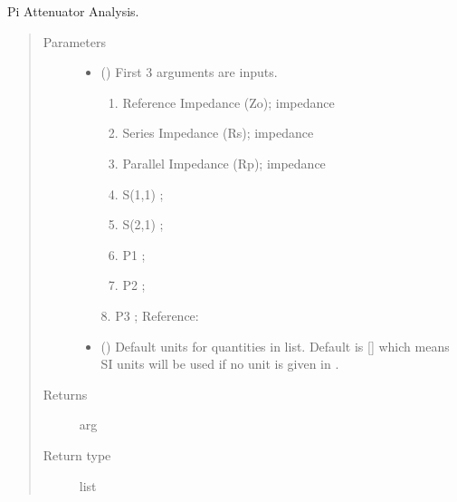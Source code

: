\documentclass[letterpaper,10pt,english]{sphinxmanual}
\begin{document}

\begin{fulllineitems}
\label{\detokenize{components:components.Pi_Attenuator_Synthesis}}
Pi Attenuator Analysis.
\begin{quote}\begin{description}
\item[{Parameters}] \leavevmode\begin{itemize}
\item {} 
 () \textendash{} 
First 3 arguments are inputs.
\begin{enumerate}
%
\item {} 
Reference Impedance (Zo); impedance

\item {} 
Series Impedance (Rs); impedance

\item {} 
Parallel Impedance (Rp); impedance

\item {} 
S(1,1) ;

\item {} 
S(2,1) ;

\item {} 
P1 ;

\item {} 
P2 ;

\end{enumerate}

8. P3 ;
Reference:


\item {} 
 (\sphinxstyleliteralemphasis{\sphinxupquote{, }}) \textendash{} Default units for quantities in  list. Default is {[}{]} which means SI units will be used if no unit is given in .

\end{itemize}

\item[{Returns}] \leavevmode
arg

\item[{Return type}] \leavevmode
list

\end{description}\end{quote}

\end{fulllineitems}
\end{document}
